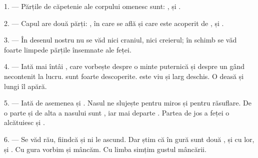%

\VUsaut{4.0mm}
\VUsaut{2.0mm}

\VUsaut{2.4mm}
\VUsaut{3.0mm}

1. --- Părțile de căpetenie ale corpului omenesc sunt: ,
 și .

\VUsaut{3.0mm}

2. --- Capul are două părți: , în care se află 
și care este acoperit de , și .

3. --- În desenul nostru nu se văd nici craniul, nici creierul; în schimb se văd
foarte limpede părțile însemnate ale feței.

4. --- Iată mai întâi , care vorbește despre o minte puternică și
despre un gând necontenit la lucru.  sunt foarte descoperite.
 este viu și larg deschis. O  deasă și
 lungi îl apără.

5. --- Iată de asemenea  și . Nasul ne slujește
pentru miros și pentru răsuflare. De o parte și de alta a nasului sunt
, iar mai departe . Partea de jos a feței o
alcătuiesc  și .

6. --- Se văd rău, fiindcă  și  ni le ascund. Dar
știm că în gură sunt două ,  și
 cu  lor, și . Cu gura
vorbim și mâncăm. Cu limba simțim gustul mâncării.

